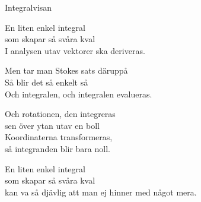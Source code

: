 \begin{song}{Integralvisan}

    

    En liten enkel integral\\
	som skapar så svåra kval\\
	I analysen utav vektorer ska deriveras.
	
	Men tar man Stokes sats däruppå\\
	Så blir det så enkelt så\\
	Och integralen, och integralen evalueras.

	Och rotationen, den integreras\\
	sen över ytan utav en boll\\
	Koordinaterna transformeras,\\
	så integranden blir bara noll.

	En liten enkel integral\\
	som skapar så svåra kval\\
	kan va så djävlig att man ej hinner med något mera.
	
\end{song}
